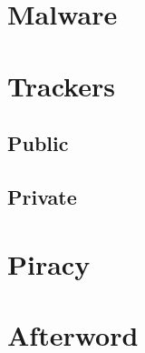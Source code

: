 \documentclass{article}
\begin{document}
\section{Malware}
\section{Trackers}
	\subsection{Public}
	\subsection{Private}
\section{Piracy}
\section{Afterword}
\end{document}
